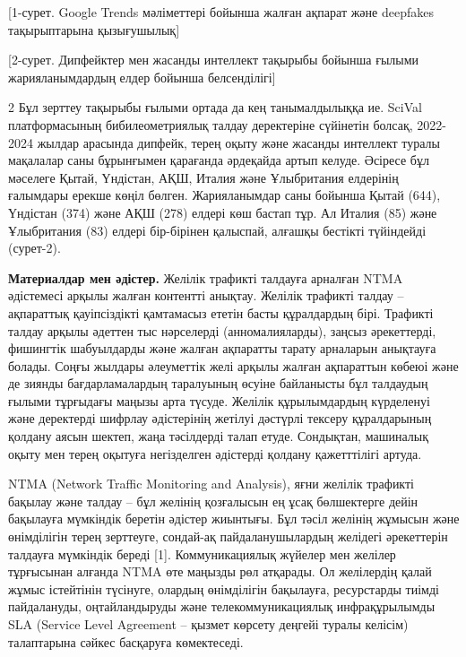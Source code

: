 [1-сурет. Google Trends мәліметтері бойынша жалған ақпарат және
deepfakes тақырыптарына қызығушылық]

[2-сурет. Дипфейктер мен жасанды интеллект тақырыбы бойынша
ғылыми жарияланымдардың елдер бойынша белсенділігі]

\begin{multicols}{2}
Бұл зерттеу тақырыбы ғылыми ортада да кең танымалдылыққа ие. SciVal
платформасының бибилеометриялық талдау деректеріне сүйінетін болсақ,
2022-2024 жылдар арасында дипфейк, терең оқыту және жасанды интеллект
туралы мақалалар саны бұрынғымен қарағанда әрдеқайда артып келуде.
Әсіресе бұл мәселеге Қытай, Үндістан, АҚШ, Италия және Ұлыбритания
елдерінің ғалымдары ерекше көңіл бөлген. Жарияланымдар саны бойынша
Қытай (644), Үндістан (374) және АҚШ (278) елдері көш бастап тұр. Ал
Италия (85) және Ұлыбритания (83) елдері бір-бірінен қалыспай, алғашқы
бестікті түйіндейді (сурет-2).

{\bfseries Материалдар мен әдістер.} Желілік трафикті талдауға арналған
NTMA әдістемесі арқылы жалған контентті анықтау. Желілік трафикті талдау
-- ақпараттық қауіпсіздікті қамтамасыз ететін басты құралдардың бірі.
Трафикті талдау арқылы әдеттен тыс нәрселерді (анномалияларды), заңсыз
әрекеттерді, фишингтік шабуылдарды және жалған ақпаратты тарату
арналарын анықтауға болады. Соңғы жылдары әлеуметтік желі арқылы жалған
ақпараттын көбеюі және де зиянды бағдарламалардың таралуының өсуіне
байланысты бұл талдаудың ғылыми тұрғыдағы маңызы арта түсуде. Желілік
құрылымдардың күрделенуі және деректерді шифрлау әдістерінің жетілуі
дәстүрлі тексеру құралдарының қолдану аясын шектеп, жаңа тәсілдерді
талап етуде. Сондықтан, машиналық оқыту мен терең оқытуға негізделген
әдістерді қолдану қажетттілігі артуда.

NTMA (Network Traffic Monitoring and Analysis), яғни желілік трафикті
бақылау және талдау -- бұл желінің қозғалысын ең ұсақ бөлшектерге дейін
бақылауға мүмкіндік беретін әдістер жиынтығы. Бұл тәсіл желінің жұмысын
және өнімділігін терең зерттеуге, сондай-ақ пайдаланушылардың желідегі
әрекеттерін талдауға мүмкіндік береді {[}1{]}. Коммуникациялық жүйелер
мен желілер тұрғысынан алғанда NTMA өте маңызды рөл атқарады. Ол
желілердің қалай жұмыс істейтінін түсінуге, олардың өнімділігін
бақылауға, ресурстарды тиімді пайдалануды, оңтайландыруды және
телекоммуникациялық инфрақұрылымды SLA (Service Level Agreement --
қызмет көрсету деңгейі туралы келісім) талаптарына сәйкес басқаруға
көмектеседі.


\end{multicols}
